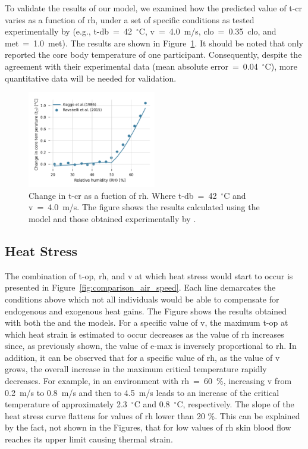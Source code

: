 To validate the results of our model, we examined how the predicted value of \ac{t-cr} varies as a function of \ac{rh}, under a set of specific conditions as tested experimentally by  (e.g., \ac{t-db}~=~42~$^{\circ}$C, \ac{v}~=~4.0~m/s, \ac{clo}~=~0.35~clo, and \ac{met}~=~1.0~met).
The results are shown in Figure~\ref{fig:comparison_ravanelli}.
It should be noted that  only reported the core body temperature of one participant.
Consequently, despite the agreement with their experimental data (mean absolute error~=~0.04~$^{\circ}$C), more quantitative data will be needed for validation.

\begin{figure}[thb!]
    \centering
    \includegraphics[width=0.5\textwidth]{figures/comparison_ravanelli}
    \caption{Change in \acf{t-cr} as a fuction of \acf{rh}.
    Where \ac{t-db}~=~42~$^{\circ}$C and \ac{v}~=~4.0~m/s.
    The figure shows the results calculated using the  model and those obtained experimentally by .}
    \label{fig:comparison_ravanelli}
\end{figure}

\subsection{Heat Stress}\label{subsec:heat-stress}

The combination of \ac{t-op}, \ac{rh}, and \ac{v} at which heat stress would start to occur is presented in Figure~\ref{fig:comparison_air_speed}.
Each line demarcates the conditions above which not all individuals would be able to compensate for endogenous and exogenous heat gains.
The Figure shows the results obtained with both the  and the  models.
For a specific value of \ac{v}, the maximum \ac{t-op} at which heat strain is estimated to occur decreases as the value of \ac{rh} increases since, as previously shown, the value of \ac{e-max} is inversely proportional to \ac{rh}.
In addition, it can be observed that for a specific value of \ac{rh}, as the value of \ac{v} grows, the overall increase in the maximum critical temperature rapidly decreases.
For example, in an environment with \ac{rh}~=~60~\%, increasing \ac{v} from 0.2~m/s to 0.8~m/s and then to 4.5~m/s leads to an increase of the critical temperature of approximately 2.3~$^{\circ}$C and 0.8~$^{\circ}$C, respectively.
The slope of the heat stress curve flattens for values of \ac{rh} lower than 20 \%.
This can be explained by the fact, not shown in the Figures, that for low values of \ac{rh} skin blood flow reaches its upper limit causing thermal strain.

